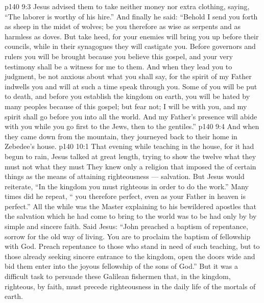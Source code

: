 \vs p140 9:3 Jesus advised them to take neither money nor extra clothing, saying, \textcolor{ubdarkred}{“The laborer is worthy of his hire.”} And finally he said: \textcolor{ubdarkred}{“Behold I send you forth as sheep in the midst of wolves; be you therefore as wise as serpents and as harmless as doves. But take heed, for your enemies will bring you up before their councils, while in their synagogues they will castigate you. Before governors and rulers you will be brought because you believe this gospel, and your very testimony shall be a witness for me to them. And when they lead you to judgment, be not anxious about what you shall say, for the spirit of my Father indwells you and will at such a time speak through you. Some of you will be put to death, and before you establish the kingdom on earth, you will be hated by many peoples because of this gospel; but fear not; I will be with you, and my spirit shall go before you into all the world. And my Father’s presence will abide with you while you go first to the Jews, then to the gentiles.”}
\vs p140 9:4 \pc And when they came down from the mountain, they journeyed back to their home in Zebedee’s house.
\vs p140 10:1 That evening while teaching in the house, for it had begun to rain, Jesus talked at great length, trying to show the twelve what they must  not what they must  They knew only a religion that imposed the  of certain things as the means of attaining righteousness --- salvation. But Jesus would reiterate, \textcolor{ubdarkred}{“In the kingdom you must  righteous in order to do the work.”} Many times did he repeat, \textcolor{ubdarkred}{“ you therefore perfect, even as your Father in heaven is perfect.”} All the while was the Master explaining to his bewildered apostles that the salvation which he had come to bring to the world was to be had only by  by simple and sincere faith. Said Jesus: \textcolor{ubdarkred}{“John preached a baptism of repentance, sorrow for the old way of living. You are to proclaim the baptism of fellowship with God. Preach repentance to those who stand in need of such teaching, but to those already seeking sincere entrance to the kingdom, open the doors wide and bid them enter into the joyous fellowship of the sons of God.”} But it was a difficult task to persuade these Galilean fishermen that, in the kingdom,  righteous, by faith, must precede  righteousness in the daily life of the mortals of earth.
